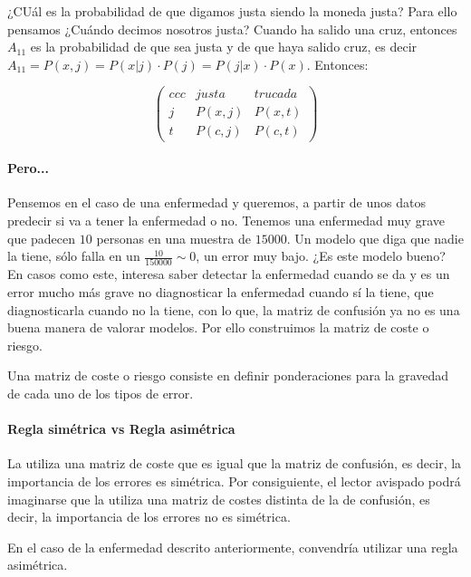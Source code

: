 \documentclass{apuntes}
\begin{document}
¿CUál es la probabilidad de que digamos justa siendo la moneda justa? Para ello pensamos ¿Cuándo decimos nosotros justa? Cuando ha salido una cruz, entonces $A_{11}$ es la probabilidad de que sea justa y de que haya salido cruz, es decir $A_{11} = P(x,j) = P(x|j)·P(j) = P(j|x)·P(x)$. Entonces:

\[
\begin{pmatrix}{ccc}
& justa & trucada \\\hline
j& P(x,j) & P(x,t)\\
t& P(c,j) & P(c,t)
\end{pmatrix}
\]




\paragraph{Pero...}

Pensemos en el caso de una enfermedad y queremos, a partir de unos datos predecir si va a tener la enfermedad o no. Tenemos una enfermedad muy grave que padecen $10$ personas en una muestra de $15000$. Un modelo que diga que nadie la tiene, sólo falla en un $\frac{10}{150000} \sim 0$, un error muy bajo. ¿Es este modelo bueno? En casos como este, interesa saber detectar la enfermedad cuando se da y es un error mucho más grave no diagnosticar la enfermedad cuando sí la tiene, que diagnosticarla cuando no la tiene, con lo que, la matriz de confusión ya no es una buena manera de valorar modelos. Por ello construimos la matriz de coste o riesgo.

\begin{defn}
	Una matriz de coste o riesgo consiste en definir ponderaciones para la gravedad de cada uno de los tipos de error. 
\end{defn}


\paragraph{Regla simétrica vs Regla asimétrica}
 La  utiliza una matriz de coste que es igual que la matriz de confusión, es decir, la importancia de los errores es simétrica.  Por consiguiente, el lector avispado podrá imaginarse que la  utiliza una matriz de costes distinta de la de confusión, es decir, la importancia de los errores no es simétrica.

 En el caso de la enfermedad descrito anteriormente, convendría utilizar una regla asimétrica. 
\end{document}
